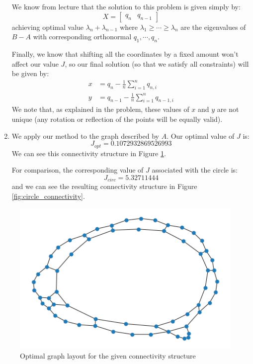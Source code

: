 \documentclass[12pt]{exam}
\begin{document}
\begin{questions}
\begin{solution}
\begin{enumerate}[label=(\alph*)]
        We know from lecture that the solution to this problem is given simply by:
        \[
          X =
            \begin{bmatrix}
              q_n & q_{n-1}
            \end{bmatrix}
        \]
        achieving optimal value $\lambda_n + \lambda_{n-1}$ where $\lambda_1 \geq \cdots \geq \lambda_n$ are the eigenvalues of $B - A$ with corresponding orthonormal $q_1, \cdots, q_n$.

        Finally, we know that shifting all the coordinates by a fixed amount won't affect our value $J$, so our final solution (so that we satisfy all constraints) will be given by:
        \begin{align*}
          x &= q_n - \frac{1}{n}\sum_{i=1}^n q_{n,i} \\
          y &= q_{n-1} - \frac{1}{n}\sum_{i=1}^n q_{n-1,i}
        \end{align*}
        We note that, as explained in the problem, these values of $x$ and $y$ are not unique (any rotation or reflection of the points will be equally valid).

        \item
          We apply our method to the graph described by $A$. Our optimal value of $J$ is:
          \[
            J_{opt} = 0.1072932869526993
          \]
          We can see this connectivity structure in Figure \ref{fig:optimal_connectivity}.
          

          For comparison, the corresponding value of $J$ associated with the circle is:
          \[
            J_{circ} = 5.32711444
          \]
          and we can see the resulting connectivity structure in Figure \ref{fig:circle_connectivity}.
      \end{enumerate}
  \end{solution}


  \begin{figure}[hpb!]
    \centering
    \includegraphics[scale=0.9]{data/optimal_graph.png}
    \caption{Optimal graph layout for the given connectivity structure}
    \label{fig:optimal_connectivity}
  \end{figure}



\end{questions}
\end{document}
